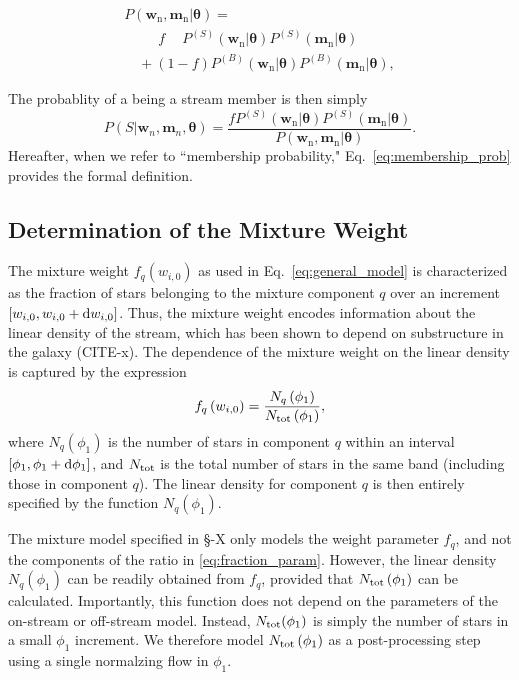 \documentclass[twocolumn]{aastex631}
\newcommand{\mrm}[1]{\mathrm{#1}}
\newcommand{\mbs}[1]{\boldsymbol{#1}}
\newcommand{\nth}[1]{{#1}_{\mrm{n}}}
\newcommand{\pdf}{P}
\begin{document}
        \begin{multline}
            \pdf(\nth{\mbs{w}}, \nth{\mbs{m}} | \mbs{\theta}) 
            = \\\phantom{+} \ \quad f \quad\ P^{(S)}(\nth{\mbs{w}}|\mbs{\theta}) P^{(S)}(\nth{\mbs{m}}|\mbs{\theta})  \\
            \quad + (1-f) P^{(B)}(\nth{\mbs{w}}|\mbs{\theta}) P^{(B)}(\nth{\mbs{m}}|\mbs{\theta}), \nonumber
        \end{multline}

        The probablity of a being a stream member is then simply
        \begin{equation}\label{eq:membership_prob}
            \pdf\left(S | \mbs{w}_n, \mbs{m}_n, \mbs{\theta} \right) = \frac{f P^{(S)}(\nth{\mbs{w}}|\mbs{\theta}) P^{(S)}(\nth{\mbs{m}}|\mbs{\theta}) }{ \pdf(\nth{\mbs{w}}, \nth{\mbs{m}} | \mbs{\theta})}.
        \end{equation}
    Hereafter, when we refer to ``membership probability," Eq.~\ref{eq:membership_prob} provides the formal definition. 

    \subsection{Determination of the Mixture Weight} \label{sub:mixture_weight}
        The mixture weight $f_q(w_{i,0})$ as used in Eq.~\ref{eq:general_model} is characterized as the fraction of stars belonging to the mixture component $q$ over an increment $[w_{i,0}, w_{i,0} + \dif{w_{i,0}}]$. Thus, the mixture weight encodes information about the linear density of the stream, which has been shown to depend on substructure in the galaxy (CITE-x). The dependence of the mixture weight on the linear density is captured by the expression
        \begin{equation}\label{eq:fraction_param}
            f_q\left(w_{i,0}\right) = \frac{N_q\left(\phi_1\right)}{N_{\rm tot}\left(\phi_1\right)},
        \end{equation}
        where $N_q\left(\phi_1\right)$ is the number of stars in component $q$ within an interval $[\phi_1, \phi_1 + \dif{\phi_1}]$, and 
        $N_{\rm tot}$ is the total number of stars in the same band (including those in component $q$). The linear  density for component $q$ is then entirely specified by the function $N_q(\phi_1)$.

        The mixture model specified in \S-X only models the weight parameter $f_q$, and not the components of the ratio in \autoref{eq:fraction_param}. However, the linear density $N_q(\phi_1)$ can be readily obtained from $f_q$, provided that $N_{\rm tot}\left(\phi_1\right)$ can be calculated. Importantly, this function does not depend on the parameters of the on-stream or off-stream model. Instead, $N_{\rm tot}(\phi_1)$ is simply the number of stars in a small $\phi_1$ increment. We therefore model $N_{\rm tot}\left(\phi_1\right)$ as a post-processing step using a single normalzing flow in $\phi_1$. 
\end{document}
